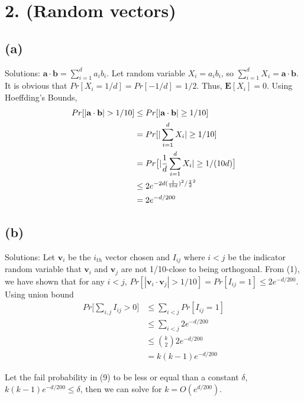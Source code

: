 \documentclass[11pt]{537homework}
\author{Peilun Dai}
\begin{document}
\section*{2. (Random vectors) }



\subsection*{(a)} 

Solutions: $\textbf{a}\cdot \textbf{b} = \sum_{i=1}^d a_i b_i$. Let random variable $X_i = a_i b_i$, so $\sum_{i=1}^d X_i = \textbf{a}\cdot \textbf{b}$. It is obvious that $Pr[X_i=1/d] = Pr[-1/d] = 1/2$. Thus, $\mathbf{E}[X_i] = 0$. Using Hoeffding's Bounds,
\begin{align}
  Pr[|\textbf{a}\cdot \textbf{b}| > 1/10] & \leq Pr[|\textbf{a}\cdot \textbf{b}| \geq 1/10]\\
                      & = Pr[|\sum_{i=1}^d X_i| \geq 1/10] \\
                      & = Pr\big[|{1\over d}\sum_{i=1}^d X_i| \geq 1/(10d)\big] \\
                      & \leq 2 e^{-2d({1 \over 10d})^2/{2 \over d}^2} \\
                      & = 2e^{-d/200}
\end{align}



\subsection*{(b)}

Solutions: Let $\textbf{v}_i$ be the $i_{th}$ vector chosen and $I_{ij}$ where $i<j$ be the indicator random variable that  $\textbf{v}_i$ and $\textbf{v}_j$ are not 1/10-close to being orthogonal. From (1), we have shown that for any $i < j$, $Pr[|\textbf{v}_i \cdot \textbf{v}_j| > 1/10] = Pr[I_{ij} = 1] \leq 2e^{-d/200}$. Using union bound 
\begin{align}
  Pr\big[\sum_{i,j}I_{ij} > 0\big] & \leq \sum_{i<j}Pr[I_{ij} =1] \\
  & \leq  \sum_{i<j}2e^{-d/200} \\
  & \leq {k \choose 2}2e^{-d/200} \\
  & = k(k-1)e^{-d/200}
\end{align}

Let the fail probability in (9) to be less or equal than a constant $\delta$, $k(k-1)e^{-d/200} \leq \delta$, then we can solve for $k = O(e^{d/200})$. 
\end{document}
